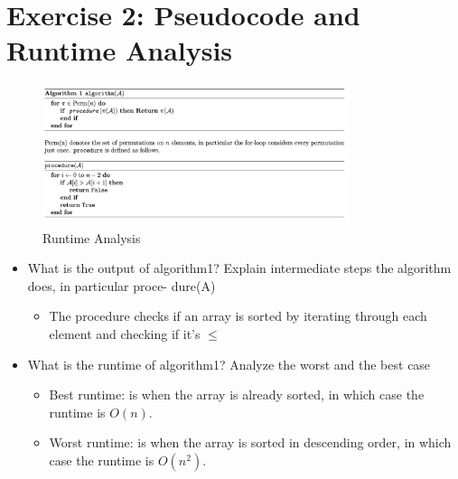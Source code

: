 \documentclass[9pt]{article}
\begin{document}
\section*{Exercise 2: Pseudocode and Runtime Analysis}
\begin{figure}[ht!]
	\centering
	\includegraphics[width=90mm]{02.jpg}
	\caption{Runtime Analysis\label{overflow}}
\end{figure}
\begin{itemize}
	\item What is the output of algorithm1? Explain intermediate steps the algorithm does, in particular proce- dure(A)
	      \begin{itemize}
		      \item The procedure checks if an array is sorted by iterating through each element and checking if it's $\leq$
	      \end{itemize}
	\item What is the runtime of algorithm1? Analyze the worst and the best case
	      \begin{itemize}
		      \item Best runtime: is when the array is already sorted, in which case the runtime is $O(n)$.
		      \item Worst runtime: is when the array is sorted in descending order, in which case the runtime is $O(n^2)$.
	      \end{itemize}

\end{itemize}
\end{document}

